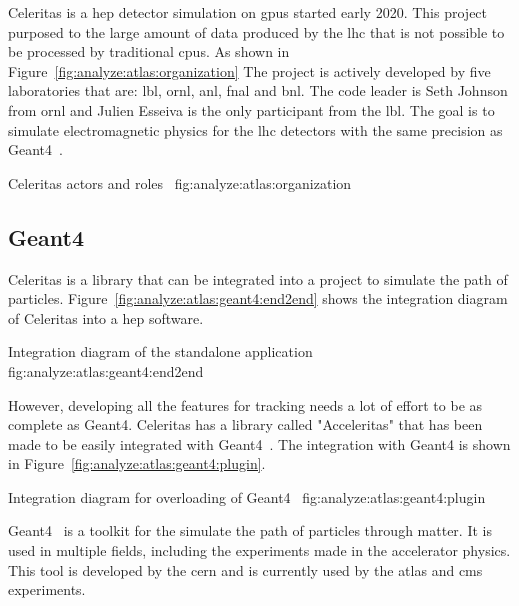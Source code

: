 Celeritas is a \acrfull{hep} detector simulation on \acrshort{gpu}s started
early 2020.
This project purposed to the large amount of data produced by the
\acrfull{lhc} that is not possible to be processed by traditional
\acrshort{cpu}s.
As shown in Figure~\ref{fig:analyze:atlas:organization} The project is actively
developed by five laboratories that are: \acrfull{lbl},
\acrfull{ornl}, \acrfull{anl}, \acrfull{fnal} and \acrfull{bnl}.
The code leader is Seth Johnson from \acrshort{ornl} and Julien Esseiva is the only
participant from the \acrshort{lbl}.
The goal is to simulate electromagnetic physics for the \acrshort{lhc} detectors
with the same precision as Geant4~\cite{geant4}.

{Celeritas actors and roles~\cite{celeritas-presentation-johnson}}
{fig:analyze:atlas:organization}


\subsection{Geant4}
\label{ch:analyze:atlas:geant4}

Celeritas is a library that can be integrated into a project to simulate the path
of particles.
Figure~\ref{fig:analyze:atlas:geant4:end2end} shows the integration diagram of
Celeritas into a \acrshort{hep} software.

{Integration diagram of the standalone application~\cite{celeritas-overview-tognini}}
{fig:analyze:atlas:geant4:end2end}


However, developing all the features for tracking needs a lot of effort to be
as complete as Geant4.
Celeritas has a library called "Acceleritas" that has been made to be easily
integrated with Geant4~\cite{geant4}.
The integration with Geant4 is shown in Figure~\ref{fig:analyze:atlas:geant4:plugin}.

    {Integration diagram for overloading of Geant4~\cite{celeritas-overview-tognini}}
    {fig:analyze:atlas:geant4:plugin}

Geant4~\cite{geant4} is a toolkit for the simulate the path of particles through
matter.
It is used in multiple fields, including the experiments made in the
accelerator physics.
This tool is developed by the \acrfull{cern} and is currently used by the
\acrshort{atlas} and \acrshort{cms} experiments.


